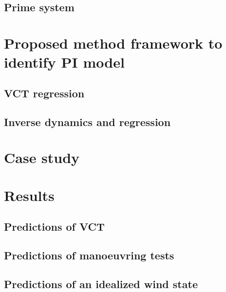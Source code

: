 \documentclass[preprint,12pt,authoryear]{elsarticle}
\begin{document}
\subsection{Prime system}
\label{sec:prime_system}


\FloatBarrier
%
%
%
\section{Proposed method framework to identify PI model}
\label{sec:methodology}

\FloatBarrier

\subsection{VCT regression}
\label{sec:VCT_regression}

\FloatBarrier
%
\subsection{Inverse dynamics and regression}
\label{sec:inverse_dynamics}

\FloatBarrier
%
%
%
\section{Case study}
\label{sec:case_study}

\FloatBarrier

\FloatBarrier
%
%
%
\section{Results}
\label{sec:results}

%
\subsection{Predictions of VCT}
\label{sec:result_VCT}

\FloatBarrier
%
\subsection{Predictions of manoeuvring tests}
\label{sec:result_MDL}

\FloatBarrier
%
\subsection{Predictions of an idealized wind state}
\label{sec:idealized_wind_state}

\FloatBarrier
%
\end{document}
